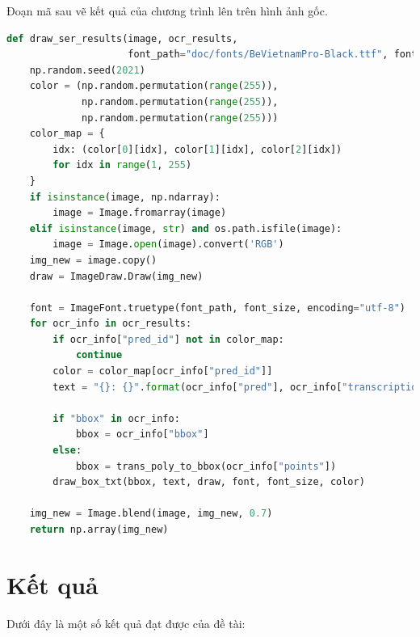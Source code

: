 Đoạn mã sau vẽ kết quả của chương trình lên trên hình ảnh gốc.
\begin{lstlisting}[language=Python]
def draw_ser_results(image, ocr_results, 
                     font_path="doc/fonts/BeVietnamPro-Black.ttf", font_size=14):
    np.random.seed(2021)
    color = (np.random.permutation(range(255)),
             np.random.permutation(range(255)),
             np.random.permutation(range(255)))
    color_map = {
        idx: (color[0][idx], color[1][idx], color[2][idx])
        for idx in range(1, 255)
    }
    if isinstance(image, np.ndarray):
        image = Image.fromarray(image)
    elif isinstance(image, str) and os.path.isfile(image):
        image = Image.open(image).convert('RGB')
    img_new = image.copy()
    draw = ImageDraw.Draw(img_new)

    font = ImageFont.truetype(font_path, font_size, encoding="utf-8")
    for ocr_info in ocr_results:
        if ocr_info["pred_id"] not in color_map:
            continue
        color = color_map[ocr_info["pred_id"]]
        text = "{}: {}".format(ocr_info["pred"], ocr_info["transcription"])

        if "bbox" in ocr_info:
            bbox = ocr_info["bbox"]
        else:
            bbox = trans_poly_to_bbox(ocr_info["points"])
        draw_box_txt(bbox, text, draw, font, font_size, color)

    img_new = Image.blend(image, img_new, 0.7)
    return np.array(img_new)    
\end{lstlisting}

\newpage
\section{Kết quả}
Dưới đây là một số kết quả đạt được của đề tài:
